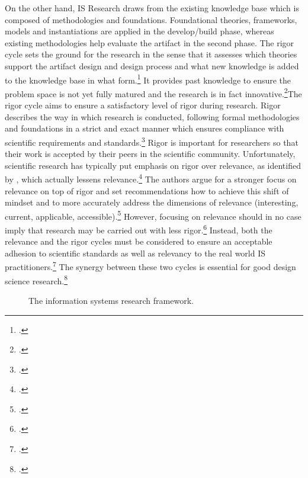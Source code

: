 On the other hand, IS Research draws from the existing knowledge base which is composed of methodologies and foundations. Foundational theories, frameworks, models and instantiations are applied in the develop/build phase, whereas existing methodologies help evaluate the artifact in the second phase. The rigor cycle sets the ground for the research in the sense that it assesses which theories support the artifact design and design process and what new knowledge is added to the knowledge base in what form.\footcite[Cf.][p.19]{HevnerDesignResearchInformation2010} It provides past knowledge to ensure the problem space is not yet fully matured and the research is in fact innovative.\footcite[Cf.][p.90]{Hevnerthreecycleview2007}The rigor cycle aims to ensure a satisfactory level of rigor during research. Rigor describes the way in which research is conducted, following formal methodologies and foundations in a strict and exact manner which ensures compliance with scientific requirements and standards.\footcite[Cf.][p.88]{HevnerDesignScienceResearch2004} Rigor is important for researchers so that their work is accepted by their peers in the scientific community. Unfortunately, scientific research has typically put emphasis on rigor over relevance, as identified by \cite{BenbasatEmpiricalresearchinformation1999}, which actually lessens relevance.\footcites[Cf.][p.88]{HevnerDesignResearchInformation2010}[cf.][p.5]{BenbasatEmpiricalresearchinformation1999} The authors argue for a stronger focus on relevance on top of rigor and set recommendations how to achieve this shift of mindset and to more accurately address the dimensions of relevance (interesting, current, applicable, accessible).\footcite[Cf.][pp.5,8-14]{BenbasatEmpiricalresearchinformation1999} However, focusing on relevance should in no case imply that research may be carried out with less rigor.\footcite[Cf.][p.5]{BenbasatEmpiricalresearchinformation1999} Instead, both the relevance and the rigor cycles must be considered to ensure an acceptable adhesion to scientific standards as well as relevancy to the real world IS practitioners.\footcite[Cf.][p.130]{ThomasBekannteundweniger2014} The synergy between these two cycles is essential for good design science research.\footcite[Cf.][p.91]{Hevnerthreecycleview2007}

\begin{figure}
    \centering
    
    \caption[The information systems research framework]{The information systems research framework.\footnotemark}
    \label{fig:ISRFramework}
\end{figure}

